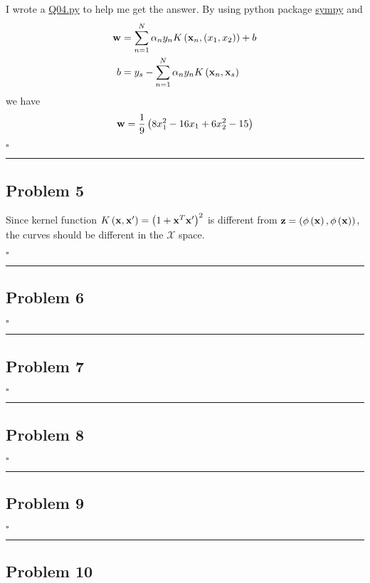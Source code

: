 \documentclass[12pt]{article}
\newcommand*{\QEDB}{\hfill\ensuremath{\square}}
\newcommand{\ParTh}[1]{\left(#1\right)}
\newcommand{\BF}[1]{{\bf#1}}
\newcommand{\horrule}[1]{\rule{\linewidth}{#1}}
\begin{document}
I wrote a \url{Q04.py} to help me get the answer. By using python package \url{sympy} and
\begin{align}
\BF{w}&=\sum_{n=1}^{N}\alpha_ny_nK\ParTh{\BF{x}_n,\ParTh{x_1,x_2}}+b\\
b&=y_s-\sum_{n=1}^{N}\alpha_ny_nK\ParTh{\BF{x}_n,\BF{x}_s}
\end{align}
we have
\begin{align}
\BF{w}=\dfrac{1}{9}\ParTh{8x^2_1 - 16x_1 + 6x^2_2-15}
\end{align}

\QEDB

\horrule{0.5pt}

\subsection*{Problem 5}

Since kernel function $K\ParTh{\BF{x},\BF{x}^\prime}=\ParTh{1+\BF{x}^T\BF{x}^\prime}^2$ is different from $\BF{z}=\ParTh{\phi\ParTh{\BF{x}},\phi\ParTh{\BF{x}}}$, the curves should be different in the $\mathcal{X}$ space.

\QEDB

\horrule{0.5pt}

\subsection*{Problem 6}

\QEDB

\horrule{0.5pt}

\subsection*{Problem 7}

\QEDB

\horrule{0.5pt}

\subsection*{Problem 8}

\QEDB

\horrule{0.5pt}

\subsection*{Problem 9}

\QEDB

\horrule{0.5pt}

\subsection*{Problem 10}
\end{document}
